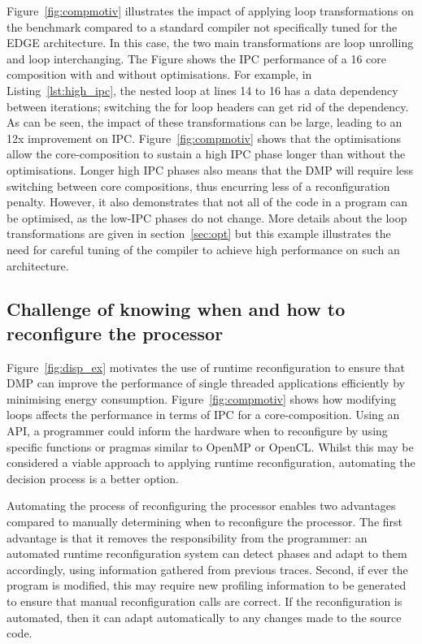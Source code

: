 Figure~\ref{fig:compmotiv} illustrates the impact of applying loop transformations on the  benchmark compared to a standard compiler not specifically tuned for the EDGE architecture.
In this case, the two main transformations are loop unrolling and loop interchanging.
The Figure shows the IPC performance of a 16 core composition with and without optimisations.
For example, in Listing~\ref{lst:high_ipc}, the nested loop at lines 14 to 16 has a data dependency between iterations; switching the for loop headers can get rid of the dependency.
As can be seen, the impact of these transformations can be large, leading to an 12x improvement on IPC.
Figure~\ref{fig:compmotiv} shows that the optimisations allow the core-composition to sustain a high IPC phase longer than without the optimisations.
Longer high IPC phases also means that the DMP will require less switching between core compositions, thus encurring less of a reconfiguration penalty.
However, it also demonstrates that not all of the code in a program can be optimised, as the low-IPC phases do not change.
More details about the loop transformations are given in section~\ref{sec:opt} but this example illustrates the need for careful tuning of the compiler to achieve high performance on such an architecture.

\subsection{Challenge of knowing when and how to reconfigure the processor}

Figure~\ref{fig:disp_ex} motivates the use of runtime reconfiguration to ensure that DMP can improve the performance of single threaded applications efficiently by minimising energy consumption.
Figure~\ref{fig:compmotiv} shows how modifying loops affects the performance in terms of IPC for a core-composition.
Using an API, a programmer could inform the hardware when to reconfigure by using specific functions or pragmas similar to OpenMP or OpenCL.
Whilst this may be considered a viable approach to applying runtime reconfiguration, automating the decision process is a better option.

Automating the process of reconfiguring the processor enables two advantages compared to manually determining when to reconfigure the processor.
The first advantage is that it removes the responsibility from the programmer: an automated runtime reconfiguration system can detect phases and adapt to them accordingly, using information gathered from previous traces.
Second, if ever the program is modified, this may require new profiling information to be generated to ensure that manual reconfiguration calls are correct.
If the reconfiguration is automated, then it can adapt automatically to any changes made to the source code.

